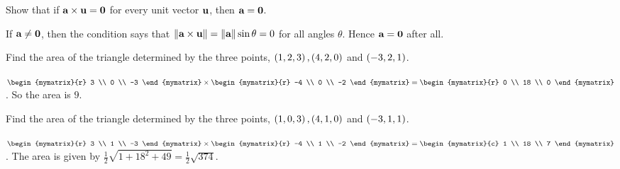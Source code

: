 \begin{enumialphparenastyle}

\begin{ex}
  Show that if $\mbox{\bf a}\times \mbox{\bf u}=\mbox{\bf 0}$ for every unit
  vector $\mbox{\bf u} $, then $\mbox{\bf a}=\mbox{\bf 0}$.
  \begin{sol}
    If $\mbox{\bf a}\neq \mbox{\bf 0}$, then the condition says that
    $\left\|\mbox{\bf a}\times \mbox{\bf u}\right\| = \left\|\mbox{\bf a}\right\| \sin \theta =0$
    for all angles $\theta$. Hence $\mbox{\bf a} = \mbox{\bf 0}$ after all.
  \end{sol}
\end{ex}

\begin{ex}
  Find the area of the triangle determined by the three points,
  $\left( 1,2,3\right) ,\left(4,2,0\right) $ and $\left(-3,2,1\right)$.
  \begin{sol}
    $\begin{mymatrix}{r}
      3 \\
      0 \\
      -3
    \end{mymatrix} \times \begin{mymatrix}{r}
      -4 \\
      0 \\
      -2
    \end{mymatrix} =\begin{mymatrix}{r}
      0 \\
      18 \\
      0
    \end{mymatrix}$. So the area is $9$.
  \end{sol}
\end{ex}

\begin{ex}
  Find the area of the triangle determined by the three points,
  $\left( 1,0,3\right) ,\left(4,1,0\right) $ and $\left(-3,1,1\right)$.
  \begin{sol}
    $\begin{mymatrix}{r}
      3 \\
      1 \\
      -3
    \end{mymatrix} \times \begin{mymatrix}{r}
      -4 \\
      1 \\
      -2
    \end{mymatrix} =\begin{mymatrix}{c}
      1 \\
      18 \\
      7
    \end{mymatrix}$. The area is given by
    $\displaystyle\frac{1}{2}\sqrt{1+18^{2}+49}=\frac{1}{2}\sqrt{374}$.
  \end{sol}
\end{ex}


\end{enumialphparenastyle}
